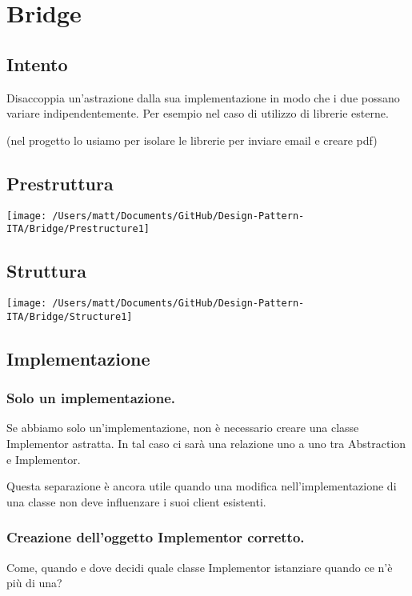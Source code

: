 \chapter{Bridge}
\section{Intento}

Disaccoppia un'astrazione dalla sua implementazione in modo che i due possano variare indipendentemente. Per esempio nel caso di utilizzo di librerie esterne.

(nel progetto lo usiamo per isolare le librerie per inviare email e creare pdf)


\section{Prestruttura}

\texttt{[image: /Users/matt/Documents/GitHub/Design-Pattern-ITA/Bridge/Prestructure1]}


\section{Struttura}

\texttt{[image: /Users/matt/Documents/GitHub/Design-Pattern-ITA/Bridge/Structure1]}


\section{Implementazione}

\subsection{Solo un implementazione.}
Se abbiamo solo un'implementazione, non è necessario creare una classe Implementor astratta. In tal caso ci sarà una relazione uno a uno tra Abstraction e Implementor.

Questa separazione è ancora utile quando una modifica nell'implementazione di una classe non deve influenzare i suoi client esistenti.

\subsection{Creazione dell'oggetto Implementor corretto.}
Come, quando e dove decidi quale classe Implementor istanziare quando ce n'è più di una?

